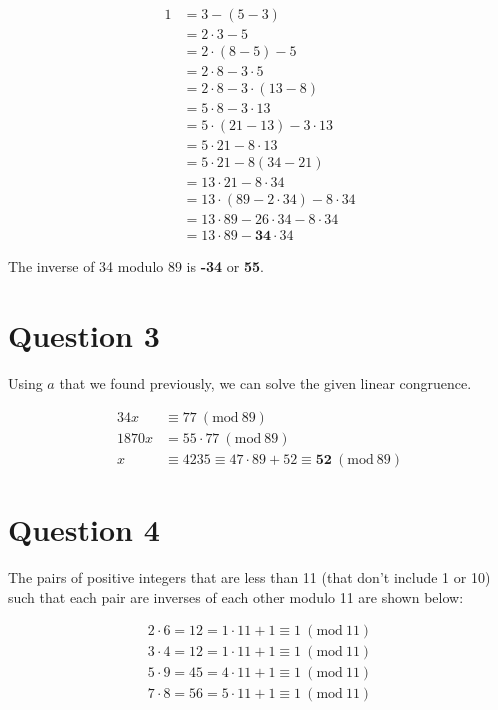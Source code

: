 \documentclass[11pt]{article}
\newcommand{\PMod}[1]{\ (\mathrm{mod}\ #1)}
\begin{document}
\begin{align*}
    1 &= 3 - (5 - 3)\\
    &= 2 \cdot 3 - 5\\
    &= 2 \cdot (8 - 5) - 5\\
    &= 2 \cdot 8 - 3 \cdot 5\\
    &= 2 \cdot 8 - 3 \cdot (13 - 8)\\
    &= 5 \cdot 8 - 3 \cdot 13\\
    &= 5 \cdot (21 - 13) - 3 \cdot 13\\
    &= 5 \cdot 21 - 8 \cdot 13\\
    &= 5 \cdot 21 - 8 (34 - 21)\\
    &= 13 \cdot 21 - 8 \cdot 34\\
    &= 13 \cdot (89 - 2 \cdot 34) - 8 \cdot 34\\
    &= 13 \cdot 89 - 26 \cdot 34 - 8 \cdot 34\\
    &= 13 \cdot 89 - \boxed{\mathbf{34}} \cdot 34
\end{align*}

The inverse of 34 modulo 89 is \textbf{-34} or \textbf{55}.

\section*{Question 3}
Using $a$ that we found previously, we can solve the given linear congruence.

\begin{align*}
    34x &\equiv 77 \PMod{89}\\
    1870x &= 55 \cdot 77 \PMod{89}\\
    x &\equiv 4235 \equiv 47 \cdot 89 + 52 \equiv \boxed{\mathbf{52}}\PMod{89}
\end{align*}

\section*{Question 4}
The pairs of positive integers that are less than 11 (that don't include 1 or 10) such that each pair are inverses of each other modulo 11 are shown below:

\begin{align*}
    2 \cdot 6 = 12 = 1\cdot 11 + 1 \equiv 1 \PMod{11} \\
    3 \cdot 4 = 12 = 1 \cdot 11 + 1 \equiv 1 \PMod{11}\\
    5 \cdot 9 = 45 = 4 \cdot 11 + 1 \equiv 1 \PMod{11}\\
    7 \cdot 8 = 56 = 5 \cdot 11 + 1 \equiv 1 \PMod{11}
\end{align*}
\end{document}
